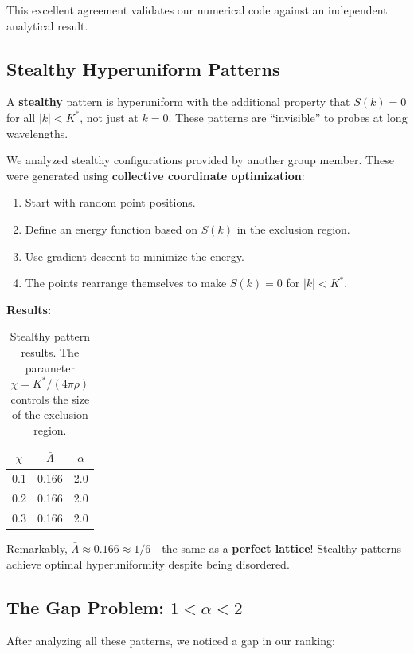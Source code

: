 \documentclass[11pt,letterpaper]{article}
\begin{document}
This excellent agreement validates our numerical code against an independent analytical result.

\subsection{Stealthy Hyperuniform Patterns}

A \textbf{stealthy} pattern is hyperuniform with the additional property that $S(k) = 0$ for all $|k| < K^*$, not just at $k = 0$. These patterns are ``invisible'' to probes at long wavelengths.

We analyzed stealthy configurations provided by another group member. These were generated using \textbf{collective coordinate optimization}:
\begin{enumerate}
    \item Start with random point positions.
    \item Define an energy function based on $S(k)$ in the exclusion region.
    \item Use gradient descent to minimize the energy.
    \item The points rearrange themselves to make $S(k) = 0$ for $|k| < K^*$.
\end{enumerate}

\textbf{Results:}
\begin{table}[H]
\centering
\begin{tabular}{ccc}
\toprule
$\chi$ & $\bar{\Lambda}$ & $\alpha$ \\
\midrule
0.1 & 0.166 & 2.0 \\
0.2 & 0.166 & 2.0 \\
0.3 & 0.166 & 2.0 \\
\bottomrule
\end{tabular}
\caption{Stealthy pattern results. The parameter $\chi = K^*/(4\pi\rho)$ controls the size of the exclusion region.}
\end{table}

Remarkably, $\bar{\Lambda} \approx 0.166 \approx 1/6$---the same as a \textbf{perfect lattice}! Stealthy patterns achieve optimal hyperuniformity despite being disordered.

\subsection{The Gap Problem: $1 < \alpha < 2$}

After analyzing all these patterns, we noticed a gap in our ranking:
\end{document}

